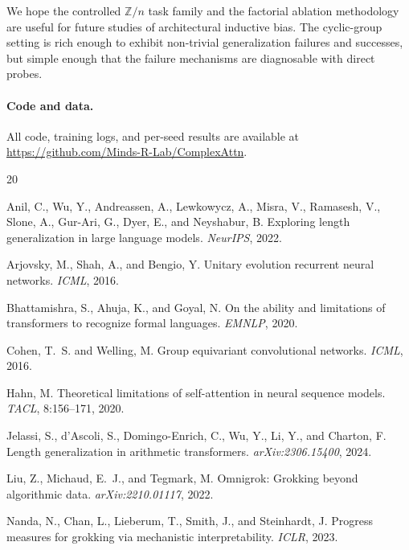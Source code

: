 \documentclass[11pt]{article}
\theoremstyle{definition}
\newcommand{\Z}{\mathbb{Z}}
\begin{document}
We hope the controlled $\Z/n$ task family and the factorial ablation
methodology are useful for future studies of architectural inductive
bias. The cyclic-group setting is rich enough to exhibit
non-trivial generalization failures and successes, but simple enough
that the failure mechanisms are diagnosable with direct probes.


\paragraph{Code and data.} All code, training logs, and per-seed
results are available at
\url{https://github.com/Minds-R-Lab/ComplexAttn}.


\small


\begin{thebibliography}{20}

Anil, C., Wu, Y., Andreassen, A., Lewkowycz, A., Misra, V., Ramasesh, V., Slone, A., Gur-Ari, G., Dyer, E., and Neyshabur, B.
\newblock Exploring length generalization in large language models.
\newblock \emph{NeurIPS}, 2022.

Arjovsky, M., Shah, A., and Bengio, Y.
\newblock Unitary evolution recurrent neural networks.
\newblock \emph{ICML}, 2016.

Bhattamishra, S., Ahuja, K., and Goyal, N.
\newblock On the ability and limitations of transformers to recognize formal languages.
\newblock \emph{EMNLP}, 2020.

Cohen, T.~S. and Welling, M.
\newblock Group equivariant convolutional networks.
\newblock \emph{ICML}, 2016.

Hahn, M.
\newblock Theoretical limitations of self-attention in neural sequence models.
\newblock \emph{TACL}, 8:156--171, 2020.

Jelassi, S., d'Ascoli, S., Domingo-Enrich, C., Wu, Y., Li, Y., and Charton, F.
\newblock Length generalization in arithmetic transformers.
\newblock \emph{arXiv:2306.15400}, 2024.

Liu, Z., Michaud, E.~J., and Tegmark, M.
\newblock Omnigrok: Grokking beyond algorithmic data.
\newblock \emph{arXiv:2210.01117}, 2022.

Nanda, N., Chan, L., Lieberum, T., Smith, J., and Steinhardt, J.
\newblock Progress measures for grokking via mechanistic interpretability.
\newblock \emph{ICLR}, 2023.


\end{thebibliography}
\end{document}
